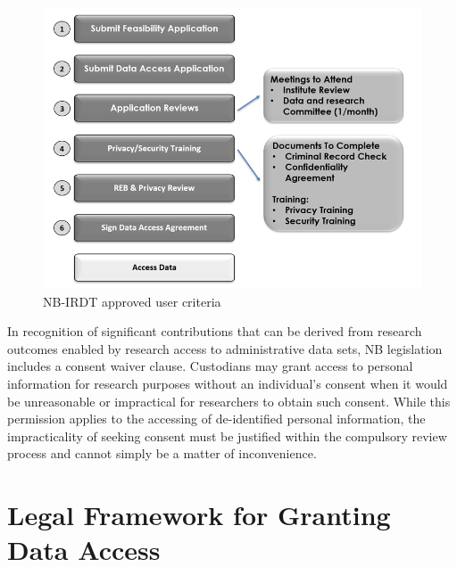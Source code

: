 \documentclass[
]{book}
\begin{document}
\begin{figure}
\includegraphics[width=1\linewidth]{./assets/nbirdt/nbirdtfigure2web} \caption{NB-IRDT approved user criteria}\label{fig:nbirdtfigure2}
\end{figure}

In recognition of significant contributions that can be derived from research outcomes enabled by research access to administrative data sets, NB legislation includes a consent waiver clause. Custodians may grant access to personal information for research purposes without an individual's consent when it would be unreasonable or impractical for researchers to obtain such consent. While this permission applies to the accessing of de-identified personal information, the impracticality of seeking consent must be justified within the compulsory review process and cannot simply be a matter of inconvenience.

\hypertarget{legal-framework-for-granting-data-access-2}{%
\section{Legal Framework for Granting Data Access}\label{legal-framework-for-granting-data-access-2}}
\end{document}
